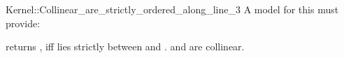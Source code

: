 \begin{ccRefFunctionObjectConcept}{Kernel::Collinear_are_strictly_ordered_along_line_3}
A model for this must provide:


         {returns , iff  lies strictly between 
          and . \ccPrecond {} and 
          are collinear.}

\ccIsModel{}

\end{ccRefFunctionObjectConcept}
